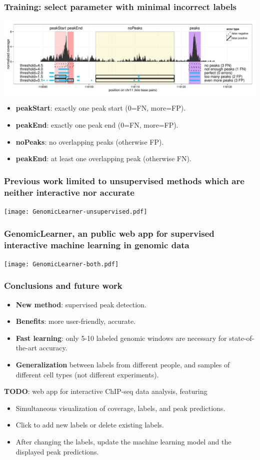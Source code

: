 \documentclass{beamer}
\begin{document}
\begin{frame}
  \frametitle{Training: select parameter with minimal incorrect labels}
  \includegraphics[width=\textwidth]{figure-PeakError.pdf}
  \begin{itemize}
  \item \textbf{peakStart}: exactly one peak start (0=FN, more=FP).
  \item \textbf{peakEnd}: exactly one peak end (0=FN, more=FP).
  \item \textbf{noPeaks}: no overlapping peaks (otherwise FP).
  \item \textbf{peakEnd}: at least one overlapping peak (otherwise FN).
  \end{itemize}
\end{frame}

\begin{frame}
  \frametitle{Previous work limited to 
    unsupervised methods
which are neither interactive nor accurate
}
  \texttt{[image: GenomicLearner-unsupervised.pdf]}
\end{frame}

\begin{frame}
  \frametitle{GenomicLearner, an public web app for supervised interactive machine learning in genomic data}
  \texttt{[image: GenomicLearner-both.pdf]}
\end{frame}


\begin{frame}
  \frametitle{Conclusions and future work}
  \begin{itemize}
  \item \textbf{New method}: supervised peak detection.
  \item \textbf{Benefits}: more user-friendly, accurate.
  \item \textbf{Fast learning}: only 5-10 labeled genomic windows are
    necessary for state-of-the-art accuracy.
  \item \textbf{Generalization} between labels from different people,
    and samples of different cell types (not different experiments).
\end{itemize}
 \textbf{TODO}: web app for interactive ChIP-seq data analysis, featuring
\begin{itemize}
  \item Simultaneous visualization of coverage, labels, and peak predictions.
  \item Click to add new labels or delete existing labels.
  \item After changing the labels, update the machine learning model
    and the displayed peak predictions.
  \end{itemize}
\end{frame}
\end{document}

